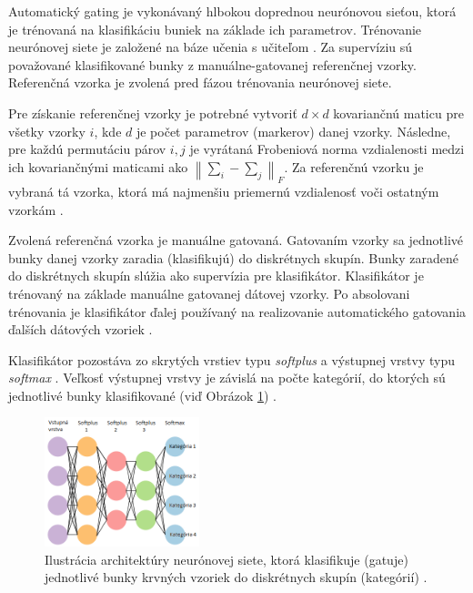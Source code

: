 Automatický gating je vykonávaný hlbokou doprednou neurónovou sieťou, ktorá je trénovaná na klasifikáciu buniek na základe ich parametrov. Trénovanie neurónovej siete je založené na báze učenia s učiteľom \cite{Goh1995}. Za supervíziu sú považované klasifikované bunky z  manuálne-gatovanej referenčnej vzorky. Referenčná vzorka je zvolená pred fázou trénovania neurónovej siete. 

Pre získanie referenčnej vzorky je potrebné vytvoriť $d \times d$ kovariančnú maticu pre všetky vzorky $i$, kde $d$ je počet parametrov (markerov) danej vzorky. Následne, pre každú permutáciu párov $i,j$ je vyrátaná Frobeniová norma \cite{formNorm} vzdialenosti medzi ich kovariančnými maticami ako $\left\lVert\sum_{i}-\sum_{j}\right\rVert_F$. Za referenčnú vzorku je vybraná tá vzorka, ktorá má najmenšiu priemernú vzdialenosť voči ostatným vzorkám \cite{Li2017}.

Zvolená referenčná vzorka je manuálne gatovaná. Gatovaním vzorky sa jednotlivé bunky danej vzorky zaradia (klasifikujú) do diskrétnych skupín. Bunky zaradené do diskrétnych skupín slúžia ako supervízia pre klasifikátor. Klasifikátor je trénovaný na základe manuálne gatovanej dátovej vzorky. Po absolovani trénovania je klasifikátor ďalej používaný na realizovanie automatického gatovania ďalších dátových vzoriek \cite{Li2017}.

Klasifikátor pozostáva zo skrytých vrstiev typu \textit{softplus} \cite{Goh1995} a výstupnej vrstvy typu \textit{softmax} \cite{Goh1995}. Veľkosť výstupnej vrstvy je závislá na počte kategórií, do ktorých sú jednotlivé bunky klasifikované (viď Obrázok \ref{cell_classifier_arch}) \cite{Li2017}.

\begin{figure}
\centerline{\includegraphics[width=0.4\textwidth]{images/cell_classifier_arch.png}}
\caption[Architektúra bunkového klasifikátora]{Ilustrácia architektúry neurónovej siete, ktorá klasifikuje (gatuje) jednotlivé bunky krvných vzoriek do diskrétnych skupín (kategórií) \cite{Li2017}.}
\label{cell_classifier_arch}
\end{figure}

